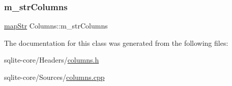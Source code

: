 \mbox{\label{classColumns_a2a592e1dfc29b2daed0013d085854aa3}} 
\subsubsection{\texorpdfstring{m\+\_\+str\+Columns}{m\_strColumns}}
{\footnotesize\ttfamily \mbox{\hyperlink{datadefinition_8h_a9ada3c20f161f474bb963207a7f7bde5}{map\+Str}} Columns\+::m\+\_\+str\+Columns}



The documentation for this class was generated from the following files\+:\begin{DoxyCompactItemize}
\item 
sqlite-\/core/\+Headers/\mbox{\hyperlink{columns_8h}{columns.\+h}}\item 
sqlite-\/core/\+Sources/\mbox{\hyperlink{columns_8cpp}{columns.\+cpp}}\end{DoxyCompactItemize}
